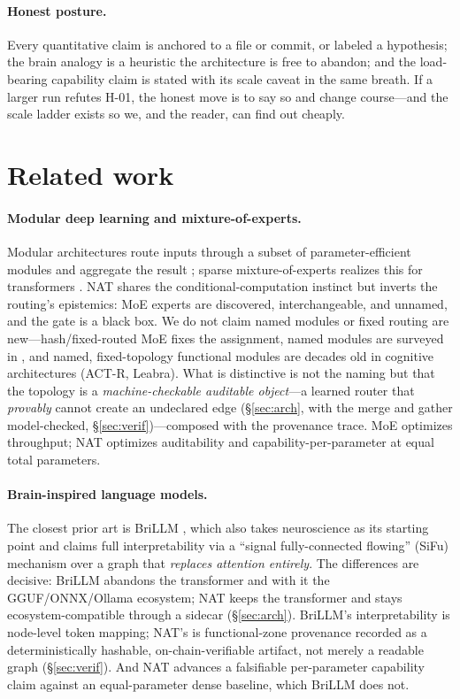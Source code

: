 \documentclass[11pt]{article}
\begin{document}
\paragraph{Honest posture.}
Every quantitative claim is anchored to a file or commit, or labeled a hypothesis; the brain analogy
is a heuristic the architecture is free to abandon; and the load-bearing capability claim is stated
with its scale caveat in the same breath. If a larger run refutes H-01, the honest move is to say so
and change course---and the scale ladder exists so we, and the reader, can find out cheaply.

\section{Related work}\label{sec:related}

\paragraph{Modular deep learning and mixture-of-experts.}
Modular architectures route inputs through a subset of parameter-efficient modules and aggregate the
result \citep{pfeiffer2023modular}; sparse mixture-of-experts realizes this for transformers
\citep{shazeer2017outrageously,lepikhin2020gshard,fedus2022switch,jiang2024mixtral}. NAT shares the
conditional-computation instinct but inverts the routing's epistemics: MoE experts are discovered,
interchangeable, and unnamed, and the gate is a black box. We do not claim named modules or fixed
routing are new---hash/fixed-routed MoE \citep{roller2021hash} fixes the assignment, named modules
are surveyed in \citet{pfeiffer2023modular}, and named, fixed-topology functional modules are decades
old in cognitive architectures (ACT-R, Leabra). What is distinctive is not the naming but that the
topology is a \emph{machine-checkable auditable object}---a learned router that \emph{provably} cannot
create an undeclared edge (\S\ref{sec:arch}, with the merge and gather model-checked,
\S\ref{sec:verif})---composed with the provenance trace. MoE optimizes throughput; NAT optimizes
auditability and capability-per-parameter at equal total parameters.

\paragraph{Brain-inspired language models.}
The closest prior art is BriLLM \citep{zhao2025brillm}, which also takes neuroscience as its starting
point and claims full interpretability via a ``signal fully-connected flowing'' (SiFu) mechanism over
a graph that \emph{replaces attention entirely}. The differences are decisive: BriLLM abandons the
transformer and with it the GGUF/ONNX/Ollama ecosystem; NAT keeps the transformer and stays
ecosystem-compatible through a sidecar (\S\ref{sec:arch}). BriLLM's interpretability is node-level
token mapping; NAT's is functional-zone provenance recorded as a deterministically hashable,
on-chain-verifiable artifact, not merely a readable graph (\S\ref{sec:verif}). And NAT advances a
falsifiable per-parameter capability claim against an equal-parameter dense baseline, which BriLLM
does not.
\end{document}
